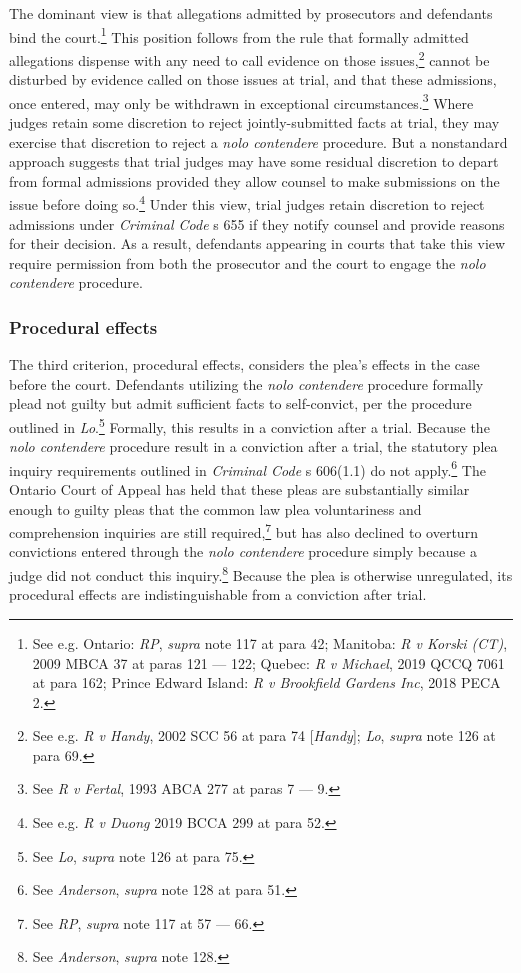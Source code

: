 The dominant view is that allegations admitted by prosecutors and defendants bind the court.\footnote{See e.g. Ontario: \textit{RP}, \textit{supra} note 117 at para 42; Manitoba: \textit{R v Korski (CT)}, 2009 MBCA 37 at paras 121 — 122; Quebec: \textit{R v Michael}, 2019 QCCQ 7061 at para 162; Prince Edward Island: \textit{R v Brookfield Gardens Inc}, 2018 PECA 2.} This position follows from the rule that formally admitted allegations dispense with any need to call evidence on those issues,\footnote{See e.g. \textit{R v Handy}, 2002 SCC 56 at para 74 [\textit{Handy}]; \textit{Lo}, \textit{supra} note 126 at para 69.} cannot be disturbed by evidence called on those issues at trial, and that these admissions, once entered, may only be withdrawn in exceptional circumstances.\footnote{See \textit{R v Fertal}, 1993 ABCA 277 at paras 7 — 9.} Where judges retain some discretion to reject jointly-submitted facts at trial, they may exercise that discretion to reject a \textit{nolo contendere} procedure. But a nonstandard approach suggests that trial judges may have some residual discretion to depart from formal admissions provided they allow counsel to make submissions on the issue before doing so.\footnote{See e.g. \textit{R v Duong} 2019 BCCA 299 at para 52.} Under this view, trial judges retain discretion to reject admissions under \textit{Criminal Code} s 655 if they notify counsel and provide reasons for their decision. As a result, defendants appearing in courts that take this view require permission from both the prosecutor and the court to engage the \textit{nolo contendere} procedure.

\subsubsection{Procedural effects}

The third criterion, procedural effects, considers the plea's effects in the case before the court. Defendants utilizing the \textit{nolo contendere} procedure formally plead not guilty but admit sufficient facts to self-convict, per the procedure outlined in \textit{Lo}.\footnote{See \textit{Lo}, \textit{supra} note 126 at para 75.} Formally, this results in a conviction after a trial. Because the \textit{nolo contendere} procedure result in a conviction after a trial, the statutory plea inquiry requirements outlined in \textit{Criminal Code} s 606(1.1) do not apply.\footnote{See \textit{Anderson}, \textit{supra} note 128 at para 51.} The Ontario Court of Appeal has held that these pleas are substantially similar enough to guilty pleas that the common law plea voluntariness and comprehension inquiries are still required,\footnote{See \textit{RP}, \textit{supra} note 117 at 57 — 66.} but has also declined to overturn convictions entered through the \textit{nolo contendere} procedure simply because a judge did not conduct this inquiry.\footnote{See \textit{Anderson}, \textit{supra} note 128.} Because the plea is otherwise unregulated, its procedural effects are indistinguishable from a conviction after trial.

